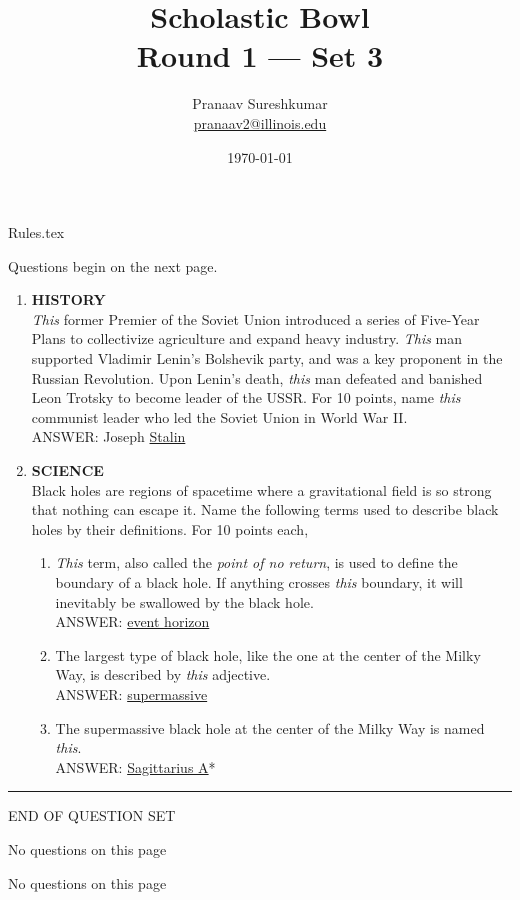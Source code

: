 \documentclass{report}
\title{\textbf{Scholastic Bowl} \\ Round 1 --- Set 3}
\author{Pranaav Sureshkumar \\ \href{mailto:pranaav2@illinois.edu}{pranaav2@illinois.edu}}
\date{\today}
\newcommand*{\backtrack}{\setcounter{enumi}{\numexpr\theenumi-1\relax}}
\begin{document}


\maketitle

{Rules.tex}

\newpage

\vspace*{\fill}
\centering
\thispagestyle{empty}
\Large
Questions begin on the next page.
\vspace*{\fill}

\normalsize
\newpage
\setcounter{page}{1}

\begin{enumerate}
    \item \textbf{HISTORY} \\ \textit{This} former Premier of the Soviet Union introduced a series of Five-Year Plans to collectivize agriculture and expand heavy industry. \textit{This} man supported Vladimir Lenin's Bolshevik party, and was a key proponent in the Russian Revolution. Upon Lenin's death, \textit{this} man defeated and banished Leon Trotsky to become leader of the USSR. For 10 points, name \textit{this} communist leader who led the Soviet Union in World War II. \\ ANSWER: Joseph \underline{Stalin} \backtrack
    \item \textbf{SCIENCE} \\ Black holes are regions of spacetime where a gravitational field is so strong that nothing can escape it. Name the following terms used to describe black holes by their definitions. For 10 points each,
    \begin{enumerate}[label=\Alph*]
        \item \textit{This} term, also called the \textit{point of no return}, is used to define the boundary of a black hole. If anything crosses \textit{this} boundary, it will inevitably be swallowed by the black hole. \\ ANSWER: \underline{event horizon}
        \item The largest type of black hole, like the one at the center of the Milky Way, is described by \textit{this} adjective. \\ ANSWER: \underline{supermassive}
        \item  The supermassive black hole at the center of the Milky Way is named \textit{this}. \\ ANSWER: \underline{Sagittarius A}*
    \end{enumerate}
\end{enumerate}


\vspace*{0.5 cm}
\centering
\rule{10 cm}{0.4pt}

\Large
END OF QUESTION SET
\newpage

\vspace*{\fill}
\centering
\thispagestyle{empty}
\Large
No questions on this page
\vspace*{\fill}

\newpage

\vspace*{\fill}
\centering
\thispagestyle{empty}
\Large
No questions on this page
\vspace*{\fill}
\end{document}

